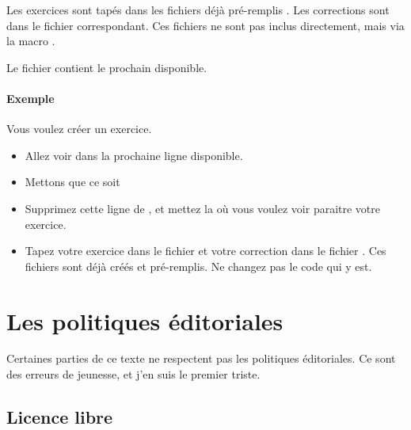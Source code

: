 \vspace{1cm}

Les exercices sont tapés dans les fichiers déjà pré-remplis . Les corrections sont dans le fichier  correspondant. Ces fichiers ne sont pas inclus directement, mais via la macro .

Le fichier  contient le prochain disponible.

\paragraph{Exemple}

Vous voulez créer un exercice.
\begin{itemize}
    \item Allez voir dans  la prochaine ligne  disponible.
    \item Mettons que ce soit   
    \item Supprimez cette ligne de , et mettez la où vous voulez voir paraitre votre exercice.
    \item Tapez votre exercice dans le fichier  et votre correction dans le fichier . Ces fichiers sont déjà créés et pré-remplis. Ne changez pas le code qui y est.
\end{itemize}

\section{Les politiques éditoriales}

Certaines parties de ce texte ne respectent pas les politiques éditoriales. Ce sont des erreurs de jeunesse, et j'en suis le premier triste.

\subsection{Licence libre}

